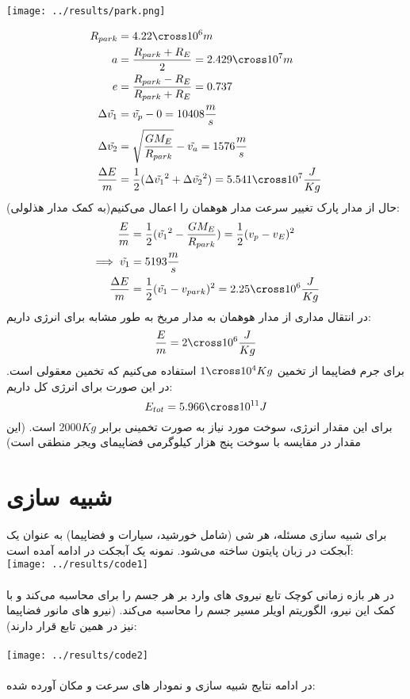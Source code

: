 \documentclass[12pt]{article}
\begin{document}
	\texttt{[image: ../results/park.png]}
	
	\begin{align}
	R_{park} &= 4.22 \cross 10^6 m\\
	a &= \frac{R_{park} + R_E}{2} = 2.429 \cross 10^7 m\\
	e &= \frac{R_{park} - R_E}{R_{park} + R_E} = 0.737 \\
	\Delta \tilde{v_1} &=\tilde{v_p} - 0 = 10408 \frac{m}{s} \\
	\Delta \tilde{v_2} &= \sqrt{\frac{GM_E}{R_{park}}} - \tilde{v_a} = 1576 \frac{m}{s} \\
	\frac{\Delta E}{m} &= \frac{1}{2} (\Delta \tilde{v_1}^2 + \Delta \tilde{v_2}^2) = 5.541\cross 10^7 \frac{J}{Kg}
	\end{align}
	حال از مدار پارک تغییر سرعت مدار هوهمان را اعمال می‌کنیم(به کمک مدار هذلولی):
	\begin{align}
	\frac{E}{m} &= \frac{1}{2}(\tilde{v_1}^2 - \frac{GM_E}{R_{park}}) = \frac{1}{2} (v_p - v_E)^2 \\
	\implies \tilde{v_1} &= 5193 \frac{m}{s} \\
	\frac{\Delta E}{m} &= \frac{1}{2} (\tilde{v_1} - v_{park})^2 = 2.25 \cross 10^6 \frac{J}{Kg}
	\end{align}
	در انتقال مداری از مدار هوهمان به مدار مریخ به طور مشابه برای انرژی داریم:
	\begin{equation}
	\frac{E}{m} = 2 \cross 10^{6} \frac{J}{Kg}
	\end{equation}
	برای جرم فضاپیما از تخمین 
	$1 \cross 10^{4} Kg$
	استفاده می‌کنیم که تخمین معقولی است. در این صورت برای انرژی کل داریم:
	\begin{equation}
	E_{tot} = 5.966 \cross 10^{11} J
	\end{equation}
	برای این مقدار انرژی، سوخت مورد نیاز به صورت تخمینی برابر 
	$2000 Kg$
	است. (این مقدار در مقایسه با سوخت پنج هزار کیلوگرمی فضاپیمای ویجر منطقی است)
	\section*{شبیه سازی}
	برای شبیه سازی مسئله، هر شی (شامل خورشید، سیارات و فضاپیما) به عنوان یک آبجکت در زبان پایتون ساخته می‌شود. نمونه یک آبجکت در ادامه آمده است: \\
	
	\texttt{[image: ../results/code1]}
	\\ \\
	در هر بازه زمانی کوچک تابع  نیروی های وارد بر هر جسم را برای محاسبه می‌کند و با کمک این نیرو، الگوریتم اویلر مسیر جسم را محاسبه می‌کند. (نیرو های مانور فضاپیما نیز در همین تابع قرار دارند): \\ \\
	\texttt{[image: ../results/code2]}
	\\ \\
	در ادامه نتایج شبیه سازی و نمودار های سرعت و مکان آورده شده: \\ \\
	
\end{document}
